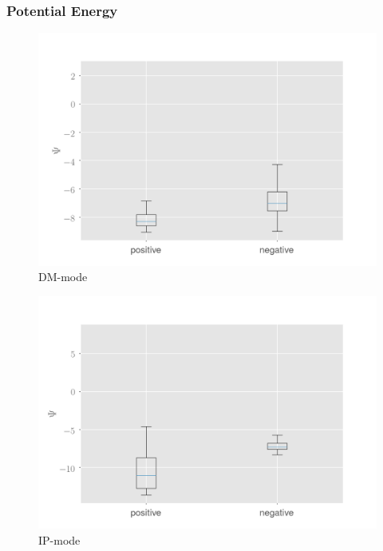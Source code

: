 \documentclass[10pt]{beamer}
\begin{document}
\begin{frame}
\frametitle{Potential Energy}
\begin{multicols}{2}
\begin{figure}
\centering
\includegraphics[scale=0.2]{figs/signal-vs-background-dm-snr}
\caption{DM-mode}
\end{figure}
\columnbreak
\begin{figure}
\centering
\includegraphics[scale=0.2]{figs/signal-vs-background-ip}
\caption{IP-mode}
\end{figure}
\end{multicols}
\end{frame}
\end{document}
